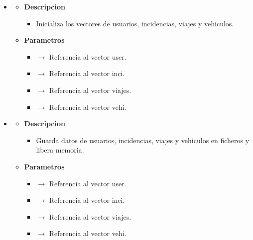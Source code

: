 \begin{itemize}
     \item \label{init}
    \begin{itemize}
        \item \textbf{Descripcion}
        \begin{itemize}
			\item Inicializa los vectores de usuarios, incidencias, viajes y vehiculos.
		\end{itemize}
		\item \textbf{Parametros}
		\begin{itemize}
			\item {} $\rightarrow$ Referencia al vector user.
			\item {} $\rightarrow$ Referencia al vector inci.
			\item {} $\rightarrow$ Referencia al vector viajes.
			\item {} $\rightarrow$ Referencia al vector vehi.
		\end{itemize}
		
	\end{itemize}
    \item \label{save}
    \begin{itemize}
        \item \textbf{Descripcion}
        \begin{itemize}
			\item Guarda datos de usuarios, incidencias, viajes y vehiculos en ficheros y libera memoria.
		\end{itemize}
		\item \textbf{Parametros}
		\begin{itemize}
			\item {} $\rightarrow$ Referencia al vector user.
			\item {} $\rightarrow$ Referencia al vector inci.
			\item {} $\rightarrow$ Referencia al vector viajes.
			\item {} $\rightarrow$ Referencia al vector vehi.
		\end{itemize}
		
	\end{itemize}

\end{itemize}

